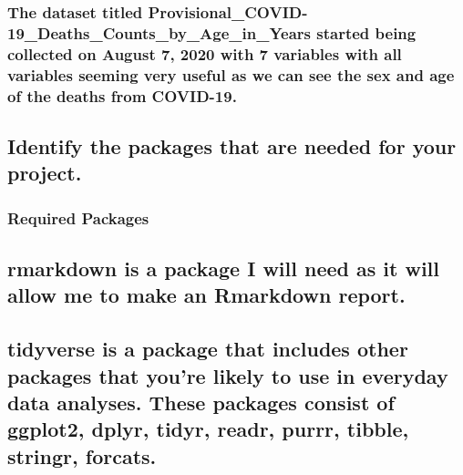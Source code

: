 \documentclass[
]{article}
\begin{document}
\hypertarget{the-dataset-titled-provisional_covid-19_deaths_counts_by_age_in_years-started-being-collected-on-august-7-2020-with-7-variables-with-all-variables-seeming-very-useful-as-we-can-see-the-sex-and-age-of-the-deaths-from-covid-19.}{%
\subsubsection{The dataset titled
Provisional\_COVID-19\_Deaths\_Counts\_by\_Age\_in\_Years started being
collected on August 7, 2020 with 7 variables with all variables seeming
very useful as we can see the sex and age of the deaths from
COVID-19.}\label{the-dataset-titled-provisional_covid-19_deaths_counts_by_age_in_years-started-being-collected-on-august-7-2020-with-7-variables-with-all-variables-seeming-very-useful-as-we-can-see-the-sex-and-age-of-the-deaths-from-covid-19.}}

\hypertarget{identify-the-packages-that-are-needed-for-your-project.}{%
\subsection{Identify the packages that are needed for your
project.}\label{identify-the-packages-that-are-needed-for-your-project.}}

\hypertarget{required-packages}{%
\subsubsection{Required Packages}\label{required-packages}}

\hypertarget{rmarkdown-is-a-package-i-will-need-as-it-will-allow-me-to-make-an-rmarkdown-report.}{%
\subsection{rmarkdown is a package I will need as it will allow me to
make an Rmarkdown
report.}\label{rmarkdown-is-a-package-i-will-need-as-it-will-allow-me-to-make-an-rmarkdown-report.}}

\hypertarget{tidyverse-is-a-package-that-includes-other-packages-that-youre-likely-to-use-in-everyday-data-analyses.-these-packages-consist-of-ggplot2-dplyr-tidyr-readr-purrr-tibble-stringr-forcats.}{%
\subsection{tidyverse is a package that includes other packages that
you're likely to use in everyday data analyses. These packages consist
of ggplot2, dplyr, tidyr, readr, purrr, tibble, stringr,
forcats.}\label{tidyverse-is-a-package-that-includes-other-packages-that-youre-likely-to-use-in-everyday-data-analyses.-these-packages-consist-of-ggplot2-dplyr-tidyr-readr-purrr-tibble-stringr-forcats.}}
\end{document}
